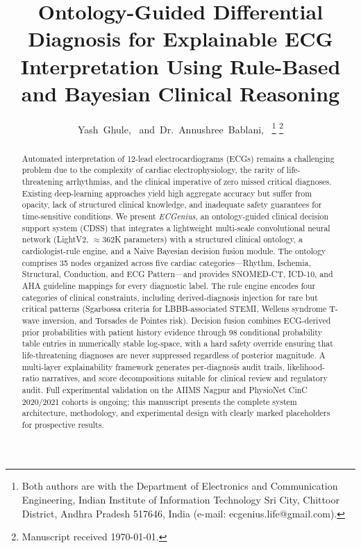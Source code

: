 \documentclass[journal]{IEEEtran}
\begin{document}
\title{Ontology-Guided Differential Diagnosis for Explainable ECG
Interpretation Using Rule-Based and Bayesian Clinical Reasoning}

\author{Yash~Ghule,~
        and~Dr.~Annushree~Bablani,~
\thanks{Both authors are with the Department of Electronics and
Communication Engineering, Indian Institute of Information Technology
Sri City, Chittoor District, Andhra Pradesh 517646, India
(e-mail: ecgenius.life@gmail.com).}
\thanks{Manuscript received \today.}
}


\maketitle

\begin{abstract}
Automated interpretation of 12-lead electrocardiograms (ECGs) remains
a challenging problem due to the complexity of cardiac electrophysiology,
the rarity of life-threatening arrhythmias, and the clinical imperative
of zero missed critical diagnoses.
Existing deep-learning approaches yield high aggregate accuracy but
suffer from opacity, lack of structured clinical knowledge, and
inadequate safety guarantees for time-sensitive conditions.
We present \textit{ECGenius}, an ontology-guided clinical decision
support system (CDSS) that integrates a lightweight multi-scale
convolutional neural network (LightV2, ${\approx}362$K parameters)
with a structured clinical ontology, a cardiologist-rule engine, and
a Naive Bayesian decision fusion module.
The ontology comprises 35 nodes organized across five cardiac
categories—Rhythm, Ischemia, Structural, Conduction, and ECG
Pattern—and provides SNOMED-CT, ICD-10, and AHA guideline mappings
for every diagnostic label.
The rule engine encodes four categories of clinical constraints,
including derived-diagnosis injection for rare but critical patterns
(Sgarbossa criteria for LBBB-associated STEMI, Wellens syndrome
T-wave inversion, and Torsades de Pointes risk).
Decision fusion combines ECG-derived prior probabilities with
patient history evidence through 98 conditional probability table
entries in numerically stable log-space, with a hard safety override
ensuring that life-threatening diagnoses are never suppressed
regardless of posterior magnitude.
A multi-layer explainability framework generates per-diagnosis audit
trails, likelihood-ratio narratives, and score decompositions suitable
for clinical review and regulatory audit.
Full experimental validation on the AIIMS Nagpur and PhysioNet
CinC\,2020/2021 cohorts is ongoing; this manuscript presents the
complete system architecture, methodology, and experimental design
with clearly marked placeholders for prospective results.
\end{abstract}
\end{document}
